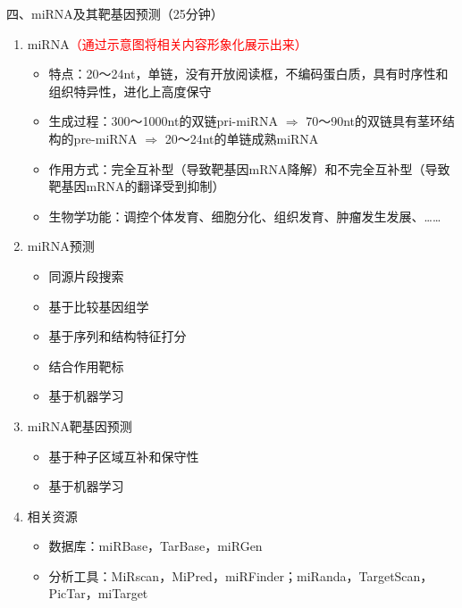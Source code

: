 \documentclass{TIJMUjiaoanLL}
\begin{document}
\noindent
四、miRNA及其靶基因预测（25分钟）
\begin{enumerate}
  \item miRNA\textcolor{red}{（通过示意图将相关内容形象化展示出来）}
    \begin{itemize}
      \item 特点：20～24nt，单链，没有开放阅读框，不编码蛋白质，具有时序性和组织特异性，进化上高度保守
      \item 生成过程：300～1000nt的双链pri-miRNA $\Rightarrow$ 70～90nt的双链具有茎环结构的pre-miRNA $\Rightarrow$ 20～24nt的单链成熟miRNA
      \item 作用方式：完全互补型（导致靶基因mRNA降解）和不完全互补型（导致靶基因mRNA的翻译受到抑制）
      \item 生物学功能：调控个体发育、细胞分化、组织发育、肿瘤发生发展、……
    \end{itemize}
  \item miRNA预测
    \begin{itemize}
      \item 同源片段搜索
      \item 基于比较基因组学
      \item 基于序列和结构特征打分
      \item 结合作用靶标
      \item 基于机器学习
    \end{itemize}
  \item miRNA靶基因预测
    \begin{itemize}
      \item 基于种子区域互补和保守性
      \item 基于机器学习
    \end{itemize}
  \item 相关资源
    \begin{itemize}
      \item 数据库：miRBase，TarBase，miRGen
      \item 分析工具：MiRscan，MiPred，miRFinder；miRanda，TargetScan，PicTar，miTarget
    \end{itemize}
\end{enumerate}
\end{document}

